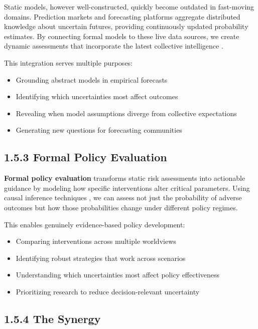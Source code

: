 \documentclass[
  11pt,
  letterpaper,
]{book}
\providecommand{\tightlist}{%
  \setlength{\itemsep}{0pt}\setlength{\parskip}{0pt}}
\begin{document}
Static models, however well-constructed, quickly become outdated in
fast-moving domains. Prediction markets and forecasting platforms
aggregate distributed knowledge about uncertain futures, providing
continuously updated probability estimates. By connecting formal models
to these live data sources, we create dynamic assessments that
incorporate the latest collective intelligence \textcite{tetlock2015}.

This integration serves multiple purposes:

\begin{itemize}
\tightlist
\item
  Grounding abstract models in empirical forecasts
\item
  Identifying which uncertainties most affect outcomes
\item
  Revealing when model assumptions diverge from collective expectations
\item
  Generating new questions for forecasting communities
\end{itemize}

\subsection{1.5.3 Formal Policy
Evaluation}\label{formal-policy-evaluation}

\textbf{Formal policy evaluation} transforms static risk assessments
into actionable guidance by modeling how specific interventions alter
critical parameters. Using causal inference techniques
\textcite{pearl2000} \textcite{pearl2009}, we can assess not just the
probability of adverse outcomes but how those probabilities change under
different policy regimes.

This enables genuinely evidence-based policy development:

\begin{itemize}
\tightlist
\item
  Comparing interventions across multiple worldviews
\item
  Identifying robust strategies that work across scenarios
\item
  Understanding which uncertainties most affect policy effectiveness
\item
  Prioritizing research to reduce decision-relevant uncertainty
\end{itemize}

\subsection{1.5.4 The Synergy}\label{the-synergy}
\end{document}

